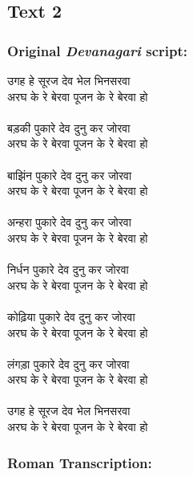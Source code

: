 \documentclass[17pt]{extarticle}
\begin{document}
\subsection*{\textbf{Text 2}}

\subsubsection*{\textbf{Original \emph{Devanagari} script:}}

\begin{hindi}
\hspace*{0.7cm}उगह हे सूरज देव भेल भिनसरवा\\
अरघ के रे बेरवा पूजन के रे बेरवा हो \\\\

बड़की पुकारे देव दुनु कर जोरवा \\
अरघ के रे बेरवा पूजन के रे बेरवा हो\\\\ 

बाझिंन पुकारे देव दुनु कर जोरवा \\
अरघ के रे बेरवा पूजन के रे बेरवा हो\\\\ 

अन्हरा पुकारे देव दुनु कर जोरवा \\
अरघ के रे बेरवा पूजन के रे बेरवा हो\\\\ 

निर्धन पुकारे देव दुनु कर जोरवा \\
अरघ के रे बेरवा पूजन के रे बेरवा हो\\\\ 

कोढ़िया पुकारे देव दुनु कर जोरवा \\
अरघ के रे बेरवा पूजन के रे बेरवा हो\\\\ 

लंगड़ा पुकारे देव दुनु कर जोरवा \\
अरघ के रे बेरवा पूजन के रे बेरवा हो\\\\ 

उगह हे सूरज देव भेल भिनसरवा \\
अरघ के रे बेरवा पूजन के रे बेरवा हो\\

\end{hindi}

\subsubsection*{\textbf{Roman Transcription:}}
\end{document}
